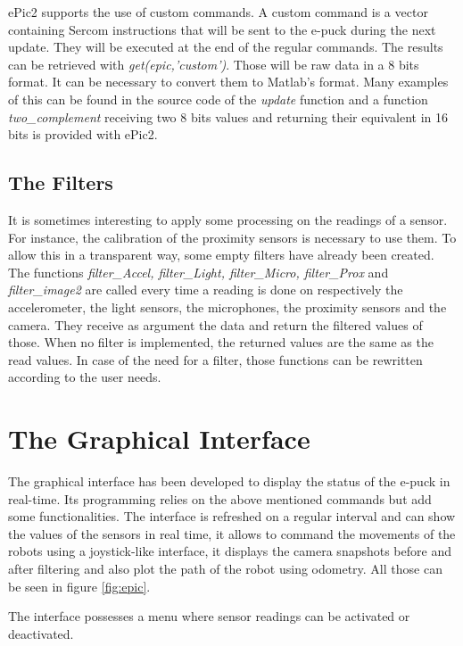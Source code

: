 \documentclass[11pt,oneside,english,a4paper]{article}
\begin{document}
\par ePic2 supports the use of custom commands. A custom command is a vector containing Sercom instructions that will be sent to the e-puck during the next update. They will be executed at the end of the regular commands. The results can be retrieved with \emph{get(epic,'custom')}. Those will be raw data in a 8 bits format. It can be necessary to convert them to Matlab's format. Many examples of this can be found in the source code of the \emph{update} function and a function \emph{two\_complement} receiving two 8 bits values and returning their equivalent in 16 bits is provided with ePic2.

\subsection{The Filters}
It is sometimes interesting to apply some processing on the readings of a sensor. For instance, the calibration of the proximity sensors is necessary to use them. To allow this in a transparent way, some empty filters have already been created. The functions \emph{filter\_Accel, filter\_Light, filter\_Micro, filter\_Prox} and \emph{filter\_image2} are called every time a reading is done on respectively the accelerometer, the light sensors, the microphones, the proximity sensors and the camera. They receive as argument the data and return the filtered values of those. When no filter is implemented, the returned values are the same as the read values. In case of the need for a filter, those functions can be rewritten according to the user needs.

\section{The Graphical Interface}
The graphical interface has been developed to display the status of the e-puck in real-time. Its programming relies on the above mentioned commands but add some functionalities. The interface is refreshed on a regular interval and can show the values of the sensors in real time, it allows to command the movements of the robots using a joystick-like interface, it displays the camera snapshots before and after filtering and also plot the path of the robot using odometry. All those can be seen in figure \ref{fig:epic}.
\par The interface possesses a menu where sensor readings can be activated or deactivated.
\end{document}

